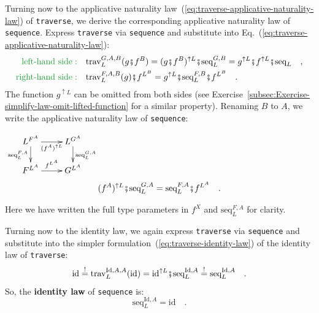 Turning now to the applicative naturality law~(\ref{eq:traverse-applicative-naturality-law})
of \lstinline!traverse!, we derive the corresponding applicative
naturality law of \lstinline!sequence!. Express \lstinline!traverse!
via \lstinline!sequence! and substitute into Eq.~(\ref{eq:traverse-applicative-naturality-law}):
\begin{align*}
{\color{greenunder}\text{left-hand side}:}\quad & \text{trav}_{L}^{G,A,B}(g\bef f^{B})=(g\bef f^{B})^{\uparrow L}\bef\text{seq}_{L}^{G,B}=g^{\uparrow L}\bef f^{\uparrow L}\bef\text{seq}_{L}\quad,\\
{\color{greenunder}\text{right-hand side}:}\quad & \text{trav}_{L}^{F,A,B}(g)\bef f^{L^{B}}=g^{\uparrow L}\bef\text{seq}_{L}^{F,B}\bef f^{L^{B}}\quad.
\end{align*}
The function $g^{\uparrow L}$ can be omitted from both sides (see
Exercise~\ref{subsec:Exercise-simplify-law-omit-lifted-function}
for a similar property). Renaming $B$ to $A$, we write the applicative
naturality law
of \lstinline!sequence!:
\begin{center}
$\xymatrix{\xyScaleY{1.5pc}\xyScaleX{2.0pc}L^{F^{A}}\ar[d]\sb(0.45){\text{seq}_{L}^{F,A}}\ar[r]\sb(0.5){(f^{A})^{\uparrow L}} & L^{G^{A}}\ar[d]\sp(0.45){\text{seq}_{L}^{G,A}}\\
F^{L^{A}}\ar[r]\sp(0.5){f^{L^{A}}} & G^{L^{A}}
}
$
\[
(f^{A})^{\uparrow L}\bef\text{seq}_{L}^{G,A}=\text{seq}_{L}^{F,A}\bef f^{L^{A}}\quad.
\]
\par\end{center}

\noindent Here we have written the full type parameters in $f^{X}$
and $\text{seq}_{L}^{F,A}$ for clarity.

Turning now to the identity law, we again express \lstinline!traverse!
via \lstinline!sequence! and substitute into the simpler formulation~(\ref{eq:traverse-identity-law})
of the identity law of \lstinline!traverse!:
\[
\text{id}\overset{!}{=}\text{trav}_{L}^{\text{Id},A,A}(\text{id})=\text{id}^{\uparrow L}\bef\text{seq}_{L}^{\text{Id},A}\overset{!}{=}\text{seq}_{L}^{\text{Id},A}\quad.
\]
So, the \textbf{identity law} of \lstinline!sequence!
is:
\begin{equation}
\text{seq}_{L}^{\text{Id},A}=\text{id}\quad.\label{eq:identity-law-of-sequence}
\end{equation}

